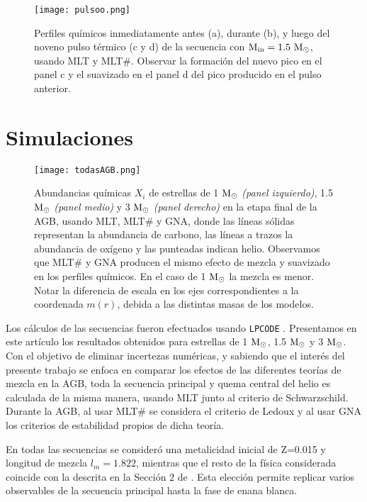\documentclass[baaa]{baaa}
\begin{document}
\begin{figure}
    \centering
    \texttt{[image: pulsoo.png]}
    \caption{Perfiles químicos inmediatamente antes (a), durante (b), y luego del noveno pulso térmico (c y d) de la secuencia con $\rm M_\text{in}=1.5 \ \rm \rm M_\odot$, usando MLT y MLT\#. Observar la formación del nuevo pico en el panel c y el suavizado en el panel d del pico producido en el pulso anterior.}
    \label{figpulso}
\end{figure}

\section{Simulaciones}\label{sec:simulaciones}

\begin{figure*}[!t]
\centering
\texttt{[image: todasAGB.png]}

\caption{Abundancias químicas $X_i$ de estrellas de 1 $\rm M_\odot$ \textit{(panel izquierdo)}, 1.5 $\rm M_\odot$ \textit{(panel medio)} y 3 $\rm M_\odot$ \textit{(panel derecho)} en la etapa final de la AGB, usando MLT, MLT\# y GNA, donde las líneas sólidas representan la abundancia de carbono, las líneas a trazos la abundancia de oxígeno y las punteadas indican helio. Observamos que MLT\# y GNA producen el mismo efecto de mezcla y suavizado en los perfiles químicos. En el caso de 1 $\rm M_\odot$ la mezcla es menor. Notar la diferencia de escala en los ejes correspondientes a la coordenada $m(r)$, debida a las distintas masas de los modelos.} 
\label{Figura}
\end{figure*}

Los cálculos de las secuencias fueron efectuados usando \texttt{LPCODE} \citep{2016A&A...588A..25M,2020A&A...633A..20A}. Presentamos en este artículo los resultados obtenidos para estrellas de  1 $\rm M_\odot$, 1.5 
 $\rm M_\odot$ y 3 $\rm M_\odot$. Con el objetivo de eliminar incertezas numéricas, y sabiendo que el interés del presente trabajo se enfoca en comparar los efectos de las diferentes teorías de mezcla en la AGB, toda la secuencia principal y quema central del helio es calculada de la misma manera, usando MLT junto al criterio de Schwarzschild. Durante la AGB, al usar MLT\# se considera el criterio de Ledoux y al usar GNA los criterios de estabilidad propios de dicha teoría.

En todas las secuencias se consideró una metalicidad inicial de Z=0.015 y longitud de mezcla $l_m=1.822$, mientras que el resto de la física considerada coincide con la descrita en la Sección 2 de \cite{2016A&A...588A..25M}. Esta elección permite replicar varios observables de la secuencia principal hasta la fase de enana blanca.  
\end{document}
